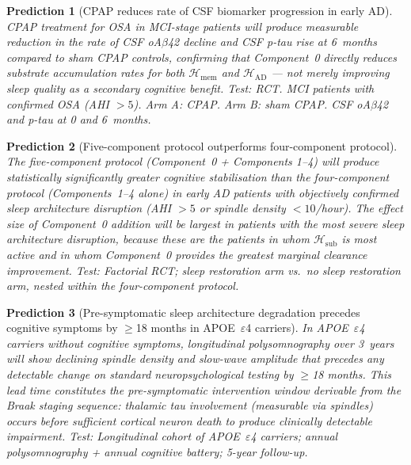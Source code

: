 \documentclass[12pt,a4paper]{article}
\newtheorem{prediction}{Prediction}
\begin{document}
\begin{prediction}[CPAP reduces rate of CSF
biomarker progression in early AD]
\label{pred:cpap}
CPAP treatment for OSA in MCI-stage patients will
produce measurable reduction in the rate of CSF
oA$\beta$42 decline and CSF p-tau rise at 6~months
compared to sham CPAP controls, confirming that
Component~0 directly reduces substrate accumulation
rates for both $\mathcal{H}_{\mathrm{mem}}$ and
$\mathcal{H}_{\mathrm{AD}}$ --- not merely improving
sleep quality as a secondary cognitive benefit.
\textit{Test:} RCT. MCI patients with confirmed
OSA (AHI $>5$). Arm A: CPAP. Arm B: sham CPAP.
CSF oA$\beta$42 and p-tau at 0 and 6~months.
\end{prediction}

\begin{prediction}[Five-component protocol
outperforms four-component protocol]
\label{pred:fivecomp}
The five-component protocol (Component~0 + Components
1--4) will produce statistically significantly greater
cognitive stabilisation than the four-component protocol
(Components~1--4 alone) in early AD patients with
objectively confirmed sleep architecture disruption
(AHI $>5$ or spindle density $<10$/hour). The
effect size of Component~0 addition will be largest
in patients with the most severe sleep architecture
disruption, because these are the patients in whom
$\mathcal{H}_{\mathrm{sub}}$ is most active and in
whom Component~0 provides the greatest marginal
clearance improvement.
\textit{Test:} Factorial RCT; sleep restoration arm
vs.\ no sleep restoration arm, nested within the
four-component protocol.
\end{prediction}

\begin{prediction}[Pre-symptomatic sleep architecture
degradation precedes cognitive symptoms by
$\geq$18 months in APOE~$\varepsilon$4 carriers]
\label{pred:presymp}
In APOE~$\varepsilon$4 carriers without cognitive
symptoms, longitudinal polysomnography over 3~years
will show declining spindle density and slow-wave
amplitude that precedes any detectable change on
standard neuropsychological testing by $\geq$18
months. This lead time constitutes the
pre-symptomatic intervention window derivable from
the Braak staging sequence: thalamic tau involvement
(measurable via spindles) occurs before sufficient
cortical neuron death to produce clinically detectable
impairment.
\textit{Test:} Longitudinal cohort of APOE~$\varepsilon$4
carriers; annual polysomnography + annual cognitive
battery; 5-year follow-up.
\end{prediction}
\end{document}
